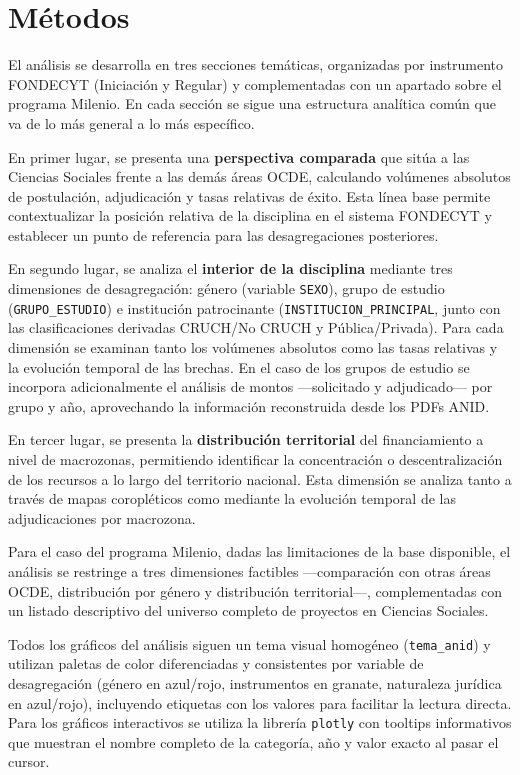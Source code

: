 \documentclass[
  spanish,
  a4paper,
  oneside]{scrbook}
\begin{document}
\section{Métodos}\label{muxe9todos}

El análisis se desarrolla en tres secciones temáticas, organizadas por
instrumento FONDECYT (Iniciación y Regular) y complementadas con un
apartado sobre el programa Milenio. En cada sección se sigue una
estructura analítica común que va de lo más general a lo más específico.

En primer lugar, se presenta una \textbf{perspectiva comparada} que
sitúa a las Ciencias Sociales frente a las demás áreas OCDE, calculando
volúmenes absolutos de postulación, adjudicación y tasas relativas de
éxito. Esta línea base permite contextualizar la posición relativa de la
disciplina en el sistema FONDECYT y establecer un punto de referencia
para las desagregaciones posteriores.

En segundo lugar, se analiza el \textbf{interior de la disciplina}
mediante tres dimensiones de desagregación: género (variable
\texttt{SEXO}), grupo de estudio (\texttt{GRUPO\_ESTUDIO}) e institución
patrocinante (\texttt{INSTITUCION\_PRINCIPAL}, junto con las
clasificaciones derivadas CRUCH/No CRUCH y Pública/Privada). Para cada
dimensión se examinan tanto los volúmenes absolutos como las tasas
relativas y la evolución temporal de las brechas. En el caso de los
grupos de estudio se incorpora adicionalmente el análisis de montos
---solicitado y adjudicado--- por grupo y año, aprovechando la
información reconstruida desde los PDFs ANID.

En tercer lugar, se presenta la \textbf{distribución territorial} del
financiamiento a nivel de macrozonas, permitiendo identificar la
concentración o descentralización de los recursos a lo largo del
territorio nacional. Esta dimensión se analiza tanto a través de mapas
coropléticos como mediante la evolución temporal de las adjudicaciones
por macrozona.

Para el caso del programa Milenio, dadas las limitaciones de la base
disponible, el análisis se restringe a tres dimensiones factibles
---comparación con otras áreas OCDE, distribución por género y
distribución territorial---, complementadas con un listado descriptivo
del universo completo de proyectos en Ciencias Sociales.

Todos los gráficos del análisis siguen un tema visual homogéneo
(\texttt{tema\_anid}) y utilizan paletas de color diferenciadas y
consistentes por variable de desagregación (género en azul/rojo,
instrumentos en granate, naturaleza jurídica en azul/rojo), incluyendo
etiquetas con los valores para facilitar la lectura directa. Para los
gráficos interactivos se utiliza la librería \texttt{plotly} con
tooltips informativos que muestran el nombre completo de la categoría,
año y valor exacto al pasar el cursor.
\end{document}
